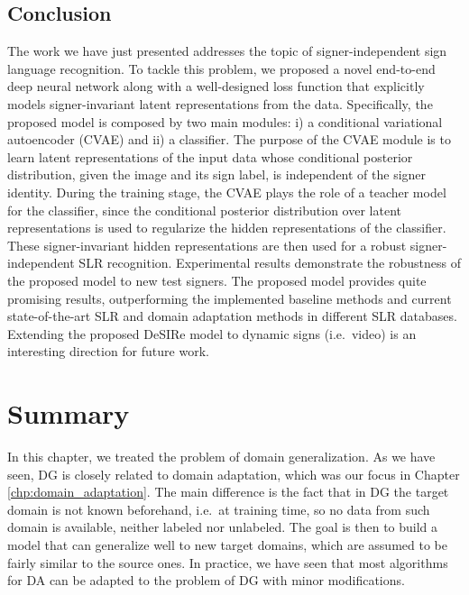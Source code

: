\subsection{Conclusion}
\label{sec:desire_conclusion}
The work we have just presented addresses the topic of signer-independent sign language recognition. To tackle this problem, we proposed a novel end-to-end deep neural network along with a well-designed loss function that explicitly models signer-invariant latent representations from the data. Specifically, the proposed model is composed by two main modules: i) a conditional variational autoencoder (CVAE) and ii) a classifier. The purpose of the CVAE module is to learn latent representations of the input data whose conditional posterior distribution, given the image and its sign label, is independent of the signer identity. During the training stage, the CVAE plays the role of a teacher model for the classifier, since the conditional posterior distribution over latent representations is used to regularize the hidden representations of the classifier. These signer-invariant hidden representations are then used for a robust signer-independent SLR recognition. Experimental results demonstrate the robustness of the proposed model to new test signers. The proposed model provides quite promising results, outperforming the implemented baseline methods and current state-of-the-art SLR and domain adaptation methods in different SLR databases. Extending the proposed DeSIRe model to dynamic signs (i.e.\ video) is an interesting direction for future work.


\section{Summary}
\label{sec:dg_summary}
In this chapter, we treated the problem of domain generalization. As we have seen, DG is closely related to domain adaptation, which was our focus in Chapter \ref{chp:domain_adaptation}. The main difference is the fact that in DG the target domain is not known beforehand, i.e.\ at training time, so no data from such domain is available, neither labeled nor unlabeled. The goal is then to build a model that can generalize well to new target domains, which are assumed to be fairly similar to the source ones. In practice, we have seen that most algorithms for DA can be adapted to the problem of DG with minor modifications.


